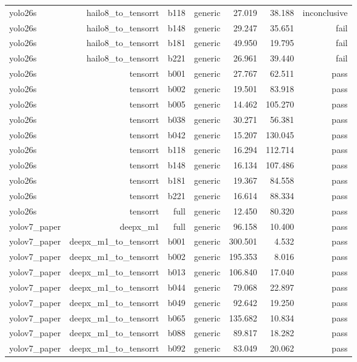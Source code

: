 \begin{table}[t]
\begin{tabular}{lrrrrrr}
yolo26s & hailo8\_to\_tensorrt & b118 & generic & 27.019 & 38.188 & inconclusive \\
yolo26s & hailo8\_to\_tensorrt & b148 & generic & 29.247 & 35.651 & fail \\
yolo26s & hailo8\_to\_tensorrt & b181 & generic & 49.950 & 19.795 & fail \\
yolo26s & hailo8\_to\_tensorrt & b221 & generic & 26.961 & 39.440 & fail \\
yolo26s & tensorrt & b001 & generic & 27.767 & 62.511 & pass \\
yolo26s & tensorrt & b002 & generic & 19.501 & 83.918 & pass \\
yolo26s & tensorrt & b005 & generic & 14.462 & 105.270 & pass \\
yolo26s & tensorrt & b038 & generic & 30.271 & 56.381 & pass \\
yolo26s & tensorrt & b042 & generic & 15.207 & 130.045 & pass \\
yolo26s & tensorrt & b118 & generic & 16.294 & 112.714 & pass \\
yolo26s & tensorrt & b148 & generic & 16.134 & 107.486 & pass \\
yolo26s & tensorrt & b181 & generic & 19.367 & 84.558 & pass \\
yolo26s & tensorrt & b221 & generic & 16.614 & 88.334 & pass \\
yolo26s & tensorrt & full & generic & 12.450 & 80.320 & pass \\
yolov7\_paper & deepx\_m1 & full & generic & 96.158 & 10.400 & pass \\
yolov7\_paper & deepx\_m1\_to\_tensorrt & b001 & generic & 300.501 & 4.532 & pass \\
yolov7\_paper & deepx\_m1\_to\_tensorrt & b002 & generic & 195.353 & 8.016 & pass \\
yolov7\_paper & deepx\_m1\_to\_tensorrt & b013 & generic & 106.840 & 17.040 & pass \\
yolov7\_paper & deepx\_m1\_to\_tensorrt & b044 & generic & 79.068 & 22.897 & pass \\
yolov7\_paper & deepx\_m1\_to\_tensorrt & b049 & generic & 92.642 & 19.250 & pass \\
yolov7\_paper & deepx\_m1\_to\_tensorrt & b065 & generic & 135.682 & 10.834 & pass \\
yolov7\_paper & deepx\_m1\_to\_tensorrt & b088 & generic & 89.817 & 18.282 & pass \\
yolov7\_paper & deepx\_m1\_to\_tensorrt & b092 & generic & 83.049 & 20.062 & pass \\

\end{tabular}
\end{table}
